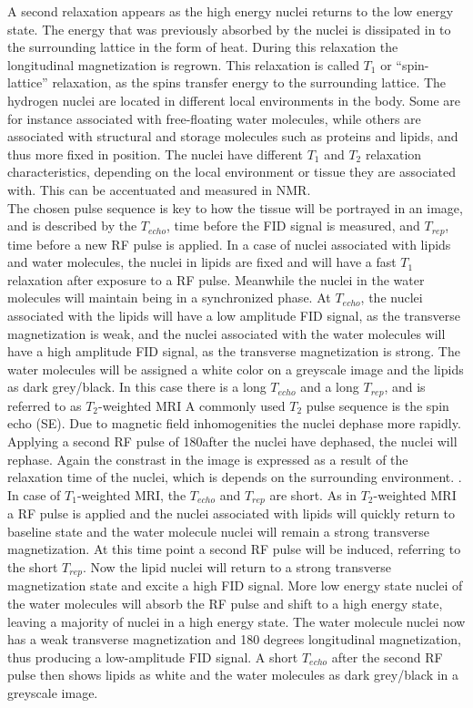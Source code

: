 A second relaxation appears as the high energy nuclei returns to the low energy state. The energy that was previously absorbed by the nuclei is dissipated in to the surrounding lattice in the form of heat. During this relaxation the longitudinal magnetization is regrown. This relaxation is called $T_1$ or “spin-lattice” relaxation, as the spins transfer energy to the surrounding lattice. \cite{Bharath2008}
The hydrogen nuclei are located in different local environments in the body. Some are for instance associated with free-floating water molecules, while others are associated with structural and storage molecules such as proteins and lipids, and thus more fixed in position. The nuclei have different $T_1$ and $T_2$ relaxation characteristics, depending on the local environment or tissue they are associated with. This can be accentuated and measured in NMR. \cite{Bharath2008} \\
The chosen pulse sequence is key to how the tissue will be portrayed in an image, and is described by the $T_{echo}$, time before the FID signal is measured, and $T_{rep}$, time before a new RF pulse is applied. In a case of nuclei associated with lipids and water molecules, the nuclei in lipids are fixed and will have a fast $T_1$ relaxation after exposure to a RF pulse. Meanwhile the nuclei in the water molecules will maintain being in a synchronized phase. At $T_{echo}$, the nuclei associated with the lipids will have a low amplitude FID signal, as the transverse magnetization is weak, and the nuclei associated with the water molecules will have a high amplitude FID signal, as the transverse magnetization is strong. The water molecules will be assigned a white color on a greyscale image and the lipids as dark grey/black. In this case there is a long $T_{echo}$ and a long $T_{rep}$, and is referred to as $T_2$-weighted MRI A commonly used $T_2$ pulse sequence is the spin echo (SE). Due to magnetic field inhomogenities the nuclei dephase more rapidly. Applying a second RF pulse of 180\degree after the nuclei have dephased, the nuclei will rephase. Again the constrast in the image is expressed as a result of the relaxation time of the nuclei, which is depends on the surrounding environment. . \cite{Bharath2008} \\
In case of $T_1$-weighted MRI, the $T_{echo}$ and $T_{rep}$ are short. As in $T_2$-weighted MRI a RF pulse is applied and the nuclei associated with lipids will quickly return to baseline state and the water molecule nuclei will remain a strong transverse magnetization. At this time point a second RF pulse will be induced, referring to the short $T_{rep}$. Now the lipid nuclei will return to a strong transverse magnetization state and excite a high FID signal. More low energy state nuclei of the water molecules will absorb the RF pulse and shift to a high energy state, leaving a majority of nuclei in a high energy state. The water molecule nuclei now has a weak transverse magnetization and 180 degrees longitudinal magnetization, thus producing a low-amplitude FID signal. A short $T_{echo}$ after the second RF pulse then shows lipids as white and the water molecules as dark grey/black in a greyscale image. \cite{Bharath2008} 

